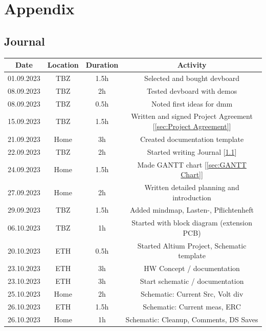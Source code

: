 \chapter{Appendix}\label{cha:Appendix}

\section{Journal}\label{sec:Journal}
\begin{table}[H]
    \centering
    
\begin{tabular}{||c | c | c || c||} 
 \hline
 Date &  Location & Duration & Activity \\ [0.5ex] 
 \hline\hline
  01.09.2023 & TBZ & 1.5h & Selected and bought \acs{devboard} \\ 
 \hline
 08.09.2023 & TBZ & 2h & Tested \acs{devboard} with demos \\ 
 \hline
  08.09.2023 & TBZ & 0.5h & Noted first ideas for \acs{dmm} \\ 
 \hline
   15.09.2023 & TBZ & 1.5h & Written and signed Project Agreement [\ref{sec:Project Agreement}] \\ 
 \hline
    21.09.2023 & Home & 3h & Created documentation template \\ 
 \hline
    22.09.2023 & TBZ & 2h &  Started writing Journal [\ref{sec:Journal}]\\ 
 \hline
    24.09.2023 & Home & 1.5h &  Made GANTT chart [\ref{sec:GANTT Chart}]\\ 
 \hline
    27.09.2023 & Home & 2h & Written detailed planning and introduction \\ 
 \hline
    29.09.2023 & TBZ & 1.5h & Added mindmap, Lasten-, Pflichtenheft \\ 
 \hline
    06.10.2023 & TBZ & 1h & Started with block diagram (extension PCB) \\ 
 \hline
    20.10.2023 & ETH & 0.5h & Started Altium Project, Schematic template \\ 
 \hline
    23.10.2023 & ETH & 3h & HW Concept / documentation \\ 
 \hline
   23.10.2023 & ETH & 3h & Start schematic / documentation \\ 
 \hline
   25.10.2023 & Home & 2h & Schematic: Current Src, Volt div \\ 
 \hline
   26.10.2023 & ETH & 1.5h & Schematic: Current meas, ERC \\ 
 \hline
   26.10.2023 & Home & 1h & Schematic: Cleanup, Comments, DS Saves \\ 

\end{tabular}
\end{table}
